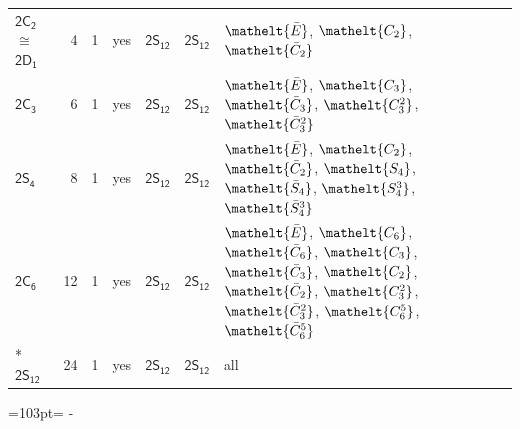 \documentclass[10pt,a4paper]{article}
\newcommand{\needspace}[1]{\par\penalty-100\begingroup\dimen0=#1\relax\dimen2=\pagegoal
  \advance\dimen2-\pagetotal\ifdim\dimen0>\dimen2\relax\ifdim\dimen2>0pt\vfil\break\fi\fi
  \endgroup}
\numberwithin{equation}{section}
\newcommand{\eltfont}[1]{{\let\sigma\eltsigma\mathelt{#1}}}
\newcommand{\grp}[1]{\mathsf{#1}}
\newcommand{\cls}[1]{\eltfont{#1}}
\newcommand{\samecls}{\cong}
\newcommand{\barred}[1]{\bar{#1}}
\newlength{\fillwidth}\newlength{\cellwidth}\newlength{\colwidth}
\begin{document}
{\begin{longtable}{@{}lrrlll>{\RaggedRight\arraybackslash}p{\fillwidth}@{}}
\href{2C2.pdf}{$\grp{2C_{2}}$} $\samecls$ \href{2D1.pdf}{$\grp{2D_{1}}$} & 4 & 1 & yes & \href{2S12.pdf}{$\grp{2S_{12}}$} & \href{2S12.pdf}{$\grp{2S_{12}}$} & $\cls{\barred{E}}$, $\cls{C_{2}}$, $\cls{\barred{C}_{2}}$\\
\href{2C3.pdf}{$\grp{2C_{3}}$} & 6 & 1 & yes & \href{2S12.pdf}{$\grp{2S_{12}}$} & \href{2S12.pdf}{$\grp{2S_{12}}$} & $\cls{\barred{E}}$, $\cls{C_{3}}$, $\cls{\barred{C}_{3}}$, $\cls{C_{3}^{2}}$, $\cls{\barred{C}_{3}^{2}}$\\
\href{2S4.pdf}{$\grp{2S_{4}}$} & 8 & 1 & yes & \href{2S12.pdf}{$\grp{2S_{12}}$} & \href{2S12.pdf}{$\grp{2S_{12}}$} & $\cls{\barred{E}}$, $\cls{C_{2}}$, $\cls{\barred{C}_{2}}$, $\cls{S_{4}}$, $\cls{\barred{S}_{4}}$, $\cls{S_{4}^{3}}$, $\cls{\barred{S}_{4}^{3}}$\\
\href{2C6.pdf}{$\grp{2C_{6}}$} & 12 & 1 & yes & \href{2S12.pdf}{$\grp{2S_{12}}$} & \href{2S12.pdf}{$\grp{2S_{12}}$} & $\cls{\barred{E}}$, $\cls{C_{6}}$, $\cls{\barred{C}_{6}}$, $\cls{C_{3}}$, $\cls{\barred{C}_{3}}$, $\cls{C_{2}}$, $\cls{\barred{C}_{2}}$, $\cls{C_{3}^{2}}$, $\cls{\barred{C}_{3}^{2}}$, $\cls{C_{6}^{5}}$, $\cls{\barred{C}_{6}^{5}}$\\*
\href{2S12.pdf}{$\grp{2S_{12}}$} & 24 & 1 & yes & \href{2S12.pdf}{$\grp{2S_{12}}$} & \href{2S12.pdf}{$\grp{2S_{12}}$} & all\\
\bottomrule\end{longtable}}
\needspace{103pt}
\end{document}
